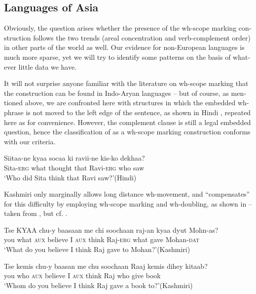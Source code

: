 \documentclass[output=paper,colorlinks,citecolor=brown]{langscibook}
\begin{document}
\begin{otherlanguage}{english}
\section{Languages of Asia } \label{languages:of:asia}

Obviously, the question arises whether the presence of the wh-scope marking construction follows the two trends (areal concentration and verb-complement order) in other parts of the world as well. Our evidence for non-European languages is much more sparse, yet we will try to identify some patterns on the basis of whatever little data we have. 

It will not surprise anyone familiar with the literature on wh-scope marking that the construction can be found in Indo-Aryan languages -- but of course, as mentioned above, we are confronted here with structures in which the embedded wh-phrase is not moved to the left edge of the sentence, as shown in Hindi , repeated here as  for convenience. However, the complement clause is still a legal embedded question, hence the classification of  as a wh-scope marking construction conforms with our criteria.

\ea 
\gll  Siitaa-ne 	kyaa 	socaa 	ki 	ravii-ne 	kis-ko 	dekhaa?  \\
    Sita-\textsc{erg} what thought that Ravi-\textsc{erg} who saw  \\
    \glt    ‘Who did Sita think that Ravi saw?'\hfill (Hindi)
    \label{ex:fanselow:37}
    \z

\noindent Kashmiri only marginally allows long distance wh-movement, and “com\-pen\-sates” for this difficulty by employing wh-scope marking and wh-doubling, as shown in -- taken from \citet{Antnonenko2010}, but cf. \citet{Wali-Koul1997}.

\ea 
\gll  Tse 	KYAA	chu-y 	baasaan 	me 	chi 	soochaan 	raj-an 	kyaa 	dyut 	Mohn-as?  \\
    you 	what 	\textsc{aux} 	believe 	I 	\textsc{aux} 	think 	Raj-\textsc{erg} 	what 	gave 	Mohan-\textsc{dat} \\
    \glt    ‘What do you believe I think Raj gave to Mohan?'\hfill (Kashmiri)
    \label{ex:fanselow:38}
    \z

    \ea 
\gll  Tse 	kemis 	chu-y 	baasan 	me 	chu 	soochaan 	Raaj 	kemis 	dihey 	kitaab?  \\
    you 	who 	\textsc{aux} 	believe 	I 	\textsc{aux} 	think 		Raj 	who 	give 	book \\
    \glt    ‘Whom do you believe I think Raj gave a book to?'\hfill (Kashmiri)
    \label{ex:fanselow:39}
    \z


\end{otherlanguage}
\end{document}
